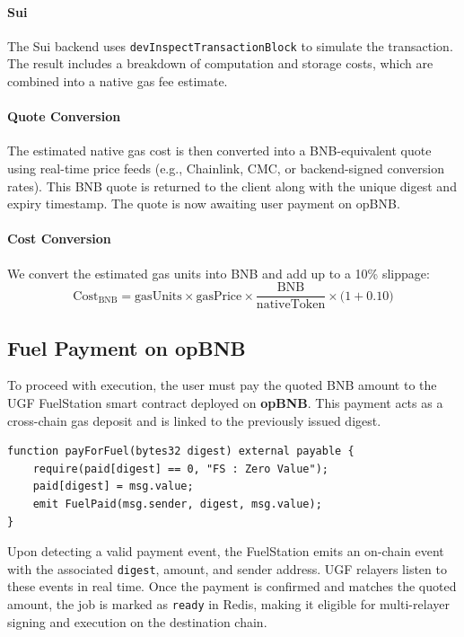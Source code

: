 \documentclass{article}
\begin{document}
\paragraph{Sui}
The Sui backend uses \texttt{devInspectTransactionBlock} to simulate the transaction. The result includes a breakdown of computation and storage costs, which are combined into a native gas fee estimate.

\paragraph{Quote Conversion}
The estimated native gas cost is then converted into a BNB-equivalent quote using real-time price feeds (e.g., Chainlink, CMC, or backend-signed conversion rates). This BNB quote is returned to the client along with the unique digest and expiry timestamp. The quote is now awaiting user payment on opBNB.

\paragraph{Cost Conversion}
We convert the estimated gas units into BNB and add up to a 10\% slippage:
\[
  \mathrm{Cost}_{\mathrm{BNB}}
    = \mathrm{gasUnits} \times \mathrm{gasPrice}
      \times \frac{\mathrm{BNB}}{\mathrm{nativeToken}}
      \times \bigl(1 + 0.10\bigr)
\]

\subsection{Fuel Payment on opBNB}
To proceed with execution, the user must pay the quoted BNB amount to the UGF FuelStation smart contract deployed on \textbf{opBNB}. This payment acts as a cross-chain gas deposit and is linked to the previously issued digest.

\begin{lstlisting}[language=Solidity, caption={FuelStation Payment Handler}]
function payForFuel(bytes32 digest) external payable {
    require(paid[digest] == 0, "FS : Zero Value");
    paid[digest] = msg.value;
    emit FuelPaid(msg.sender, digest, msg.value);
}
\end{lstlisting}

Upon detecting a valid payment event, the FuelStation emits an on-chain event with the associated \texttt{digest}, amount, and sender address. UGF relayers listen to these events in real time. Once the payment is confirmed and matches the quoted amount, the job is marked as \texttt{ready} in Redis, making it eligible for multi-relayer signing and execution on the destination chain.
\end{document}
